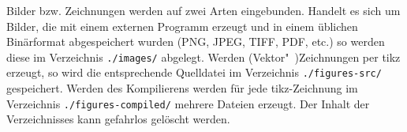 Bilder bzw. Zeichnungen werden auf zwei
Arten eingebunden. Handelt es sich um Bilder, die mit einem externen Programm
erzeugt und in einem üblichen Binärformat abgespeichert
wurden (PNG, JPEG, TIFF, PDF, etc.) so werden diese im
Verzeichnis \texttt{./images/} abgelegt. Werden (Vektor"~)Zeichnungen per
\gls{tikz} erzeugt, so wird die entsprechende Quelldatei im Verzeichnis
\texttt{./figures-src/} gespeichert. Werden des Kompilierens werden für jede
\gls{tikz}-Zeichnung im Verzeichnis \texttt{./figures-compiled/} mehrere
Dateien erzeugt. Der Inhalt der Verzeichnisses kann gefahrlos gelöscht werden.

